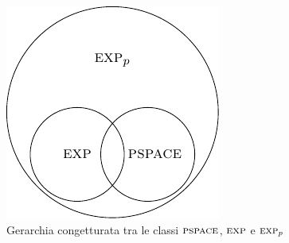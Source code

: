 \begin{figure}[h]
    \begin{center}
        \includegraphics{./img/ExpvsExppvsPSpace.pdf}
        \caption{Gerarchia congetturata tra le classi $\textsc{pspace}$, $\textsc{exp}$ e $\textsc{exp}_{p}$}
    \end{center}
\end{figure}

